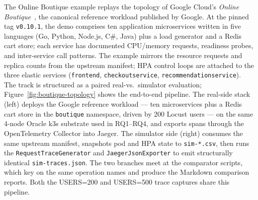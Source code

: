 \documentclass[ASNA,twocolumn]{USG}
\begin{document}
    The Online Boutique example replays the topology of Google
    Cloud's \emph{Online Boutique}~\cite{OnlineBoutique2024}, the
    canonical reference workload published by Google. At the pinned tag
    \texttt{v0.10.1}, the demo comprises ten application microservices
    written in five languages (Go, Python, Node.js, C\#, Java) plus a load
    generator and a Redis cart store; each
    service has
    documented CPU/memory requests, readiness probes, and inter-service
    call patterns. The example mirrors the resource requests and replica
    counts from the upstream manifest; HPA control loops are attached to
    the three elastic services (\texttt{frontend}, \texttt{checkoutservice},
    \texttt{recommendation\-service}). The track is structured as a paired
    real-vs.\ simulator evaluation; Figure~\ref{fig:boutique-topology}
    shows the end-to-end pipeline. The real-side stack (left) deploys the
    Google reference workload --- ten microservices plus a Redis cart
    store in the \texttt{boutique} namespace, driven by 200 Locust users
    --- on the same 4-node Oracle k3s substrate used in RQ1--RQ4, and
    exports spans through the OpenTelemetry Collector into Jaeger. The
    simulator side (right) consumes the same upstream manifest, snapshots
    pod and HPA state to \texttt{sim-*.csv}, then runs the
    \texttt{RequestTraceGenerator} and \texttt{JaegerJsonExporter} to emit
    structurally identical \texttt{sim-traces.json}. The two branches meet
    at the comparator scripts, which key on the same operation names and
    produce the Markdown comparison reports. Both the USERS=200 and
    USERS=500 trace captures share this pipeline.
\end{document}
